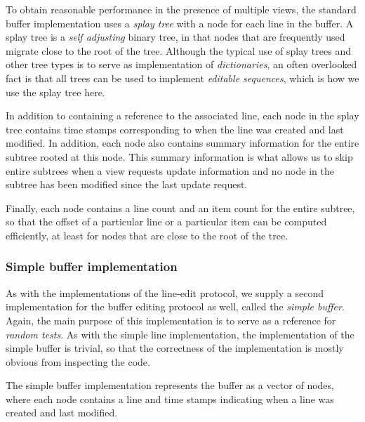 To obtain reasonable performance in the presence of multiple views,
the standard buffer implementation uses a \emph{splay tree}
\cite{Sleator:1985:SBS:3828.3835} with a node for each line in the
buffer.  A splay tree is a \emph{self adjusting} binary tree, in that
nodes that are frequently used migrate close to the root of the tree.
Although the typical use of splay trees and other tree types is to
serve as implementation of \emph{dictionaries}, an often overlooked
fact is that all trees can be used to implement \emph{editable
  sequences}, which is how we use the splay tree here.

In addition to containing a reference to the associated line, each
node in the splay tree contains time stamps corresponding to when the
line was created and last modified.  In addition, each node also
contains summary information for the entire subtree rooted at this
node.  This summary information is what allows us to skip entire
subtrees when a view requests update information and no node in the
subtree has been modified since the last update request.

Finally, each node contains a line count and an item count for the
entire subtree, so that the offset of a particular line or a
particular item can be computed efficiently, at least for nodes that
are close to the root of the tree.

\subsubsection{Simple buffer implementation}

As with the implementations of the line-edit protocol, we supply a
second implementation for the buffer editing protocol as well, called
the \emph{simple buffer}.  Again, the main purpose of this
implementation is to serve as a reference for \emph{random tests}.  As
with the simple line implementation, the implementation of the simple
buffer is trivial, so that the correctness of the implementation is
mostly obvious from inspecting the code.

The simple buffer implementation represents the buffer as a
\commonlisp{} vector of nodes, where each node contains a line and
time stamps indicating when a line was created and last modified.
